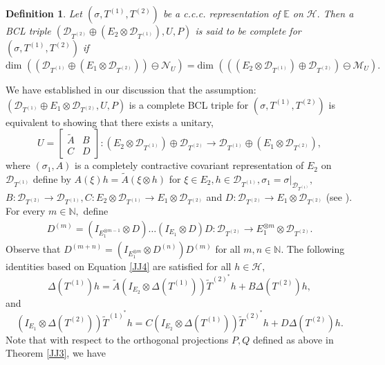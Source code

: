 \documentclass[12pt]{amsart}
\numberwithin{equation}{section}
\theoremstyle{plain}
\newtheorem{definition}[theorem]{Definition}
\newcommand{\be}{\mathbb E}
\newcommand{\ot}{\otimes}
\newcommand{\wt}{\widetilde}
\newcommand{\wT}{\wt{T}}
\begin{document}
\begin{definition}
	Let $(\sigma, T^{(1)}, T^{(2)})$ be a c.c.c. representation of $\be$ on $\mathcal H.$ Then a BCL triple $(\mathcal{D}_{ T^{(2)}} \oplus (E_2\ot \mathcal{D}_{ T^{(1)}}),U,P)$
	 is said to be complete for $(\sigma, T^{(1)}, T^{(2)})$ if $\mbox{dim~} ((\mathcal{D}_{T^{(1)}} \oplus (E_1 \ot\mathcal{D}_{ T^{(2)}}))\ominus \mathcal{N}_{U})=\mbox{dim~} (((E_2\ot \mathcal{D}_{ T^{(1)}})\oplus \mathcal{D}_{ T^{(2)}})\ominus \mathcal{M}_{U}).$
\end{definition}
We have established in our discussion that the assumption: $(\mathcal{D}_{ T^{(1)}}\oplus E_1\ot \mathcal{D}_{ T^{(2)}},U,P)$ is a complete BCL triple for $(\sigma, T^{(1)}, T^{(2)})$ is equivalent to showing that there exists a unitary,
\begin{equation}\label{Dimple1}
 U = \begin{bmatrix}\widetilde{A}&B\\C&D\end{bmatrix}:
	(E_2 \ot\mathcal{D}_{ T^{(1)}})\oplus \mathcal{D}_{ T^{(2)}} \to \mathcal{D}_{ T^{(1)}}\oplus (E_1 \ot \mathcal{D}_{ T^{(2)}}),
\end{equation} where $(\sigma_1,A)$ is a completely contractive covariant representation of $E_2$ on $\mathcal{D}_{ T^{(1)}}$ define by $A(\xi)h=\widetilde{A}(\xi\ot h)$ for $\xi\in E_2, h\in \mathcal{D}_{ T^{(1)}}, \sigma_1=\sigma|_{\mathcal{D}_{ T^{(1)}}},$ $ B:\mathcal{D}_{ T^{(2)}}\to \mathcal{D}_{ T^{(1)}}, C:E_2\ot \mathcal{D}_{ T^{(1)}}\to E_1\ot \mathcal{D}_{ T^{(2)}}$ and $D:\mathcal{D}_{ T^{(2)}}\to E_1\ot \mathcal{D}_{ T^{(2)}}$ (see \cite{ARDS1}). For every $m\in \mathbb{N},$ define 
\begin{align*}
D^{(m)}= (I_{E_1^{\otimes m-1}}\ot D)\dots(I_{E_1}\ot D)D :\mathcal{D}_{ T^{(2)}}\to E_1^{\ot m} \ot \mathcal{D}_{ T^{(2)}}.
\end{align*} Observe that $D^{(m+n)}=(I_{E_1^{\ot m}}\ot D^{(n)})D^{(m)}$ for all $m,n\in \mathbb{N}.$  The following identities based on Equation \ref{JJ4} are satisfied for all $h\in \mathcal{H},$
\begin{equation}\label{JJ5} 
\Delta(T^{(1)})h= \widetilde{A}(I_{E_2} \ot \Delta(T^{(1)}))\wT^{(2)^*}h+
	B\Delta(T^{(2)})h,
\end{equation}
and \begin{equation}\label{JJ6} 
(I_{E_1}\ot \Delta(T^{(2)}))\wT^{(1)^*}h= C(I_{E_2} \ot \Delta(T^{(1)}))\wT^{(2)^*}h+
D\Delta(T^{(2)})h.
\end{equation} Note that with respect to the orthogonal projections $P,Q$ defined as above in Theorem \ref{JJ3}, we have
\end{document}
